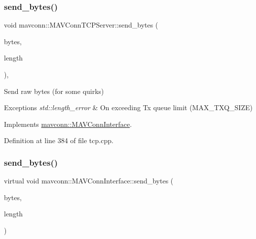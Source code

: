 \subsubsection{\texorpdfstring{send\_bytes()}{send\_bytes()}\hspace{0.1cm}{\footnotesize\ttfamily [4/5]}}
{\footnotesize\ttfamily void mavconn\+::\+M\+A\+V\+Conn\+T\+C\+P\+Server\+::send\+\_\+bytes (\begin{DoxyParamCaption}\item[{const uint8\+\_\+t $\ast$}]{bytes,  }\item[{size\+\_\+t}]{length }\end{DoxyParamCaption})\hspace{0.3cm}{\ttfamily [override]}, {\ttfamily [virtual]}}



Send raw bytes (for some quirks) 


\begin{DoxyExceptions}{Exceptions}
{\em std\+::length\+\_\+error} & On exceeding Tx queue limit (M\+A\+X\+\_\+\+T\+X\+Q\+\_\+\+S\+I\+ZE) \\
\hline
\end{DoxyExceptions}


Implements \mbox{\hyperlink{group__mavconn_ga7d00279e176e9a6890ed47ab1ceeb597}{mavconn\+::\+M\+A\+V\+Conn\+Interface}}.



Definition at line 384 of file tcp.\+cpp.

\mbox{\label{group__mavconn_ga7d00279e176e9a6890ed47ab1ceeb597}} 
\subsubsection{\texorpdfstring{send\_bytes()}{send\_bytes()}\hspace{0.1cm}{\footnotesize\ttfamily [5/5]}}
{\footnotesize\ttfamily virtual void mavconn\+::\+M\+A\+V\+Conn\+Interface\+::send\+\_\+bytes (\begin{DoxyParamCaption}\item[{const uint8\+\_\+t $\ast$}]{bytes,  }\item[{size\+\_\+t}]{length }\end{DoxyParamCaption})\hspace{0.3cm}{\ttfamily [pure virtual]}}



